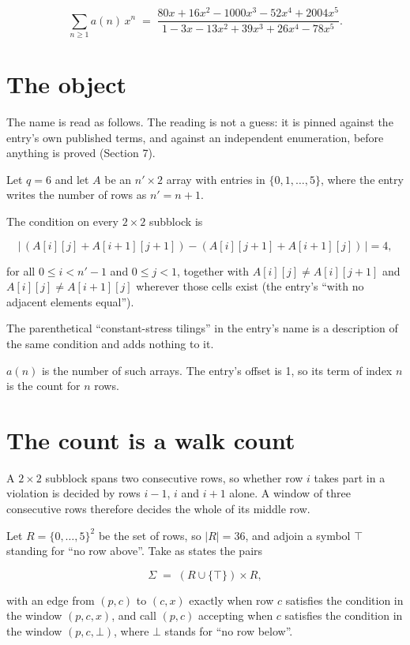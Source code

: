 \documentclass[11pt]{article}
\theoremstyle{definition}
\begin{document}
\[\sum_{n \ge 1} a(n)\,x^n \;=\; \frac{80x + 16x^{2} - 1000x^{3} - 52x^{4} + 2004x^{5}}{1 - 3x - 13x^{2} + 39x^{3} + 26x^{4} - 78x^{5}}.\]

\section{The object}

The name is read as follows. The reading is not a guess: it is pinned against the entry's own published terms, and against an independent enumeration, before anything is proved (Section 7).

Let $q = 6$ and let $A$ be an $n' \times 2$ array with entries in $\{0,1,\dots,5\}$, where the entry writes the number of rows as $n' = n + 1$.

The condition on every $2 \times 2$ subblock is

\[\bigl|\,(A[i][j] + A[i{+}1][j{+}1]) - (A[i][j{+}1] + A[i{+}1][j])\,\bigr| = 4,\]

for all $0 \le i < n'-1$ and $0 \le j < 1$, together with $A[i][j] \ne A[i][j{+}1]$ and $A[i][j] \ne A[i{+}1][j]$ wherever those cells exist (the entry's ``with no adjacent elements equal'').

The parenthetical ``constant-stress tilings'' in the entry's name is a description of the same condition and adds nothing to it.

$a(n)$ is the number of such arrays. The entry's offset is 1, so its term of index $n$ is the count for $n$ rows.

\section{The count is a walk count}

A $2 \times 2$ subblock spans two consecutive rows, so whether row $i$ takes part in a violation is decided by rows $i-1$, $i$ and $i+1$ alone. A window of three consecutive rows therefore decides the whole of its middle row.

Let $R = \{0,\dots,5\}^{2}$ be the set of rows, so $|R| = 36$, and adjoin a symbol $\top$ standing for ``no row above''. Take as states the pairs

\[\Sigma \;=\; (R \cup \{\top\}) \times R,\]

with an edge from $(p,c)$ to $(c,x)$ exactly when row $c$ satisfies the condition in the window $(p,c,x)$, and call $(p,c)$ accepting when $c$ satisfies the condition in the window $(p,c,\bot)$, where $\bot$ stands for ``no row below''.
\end{document}
